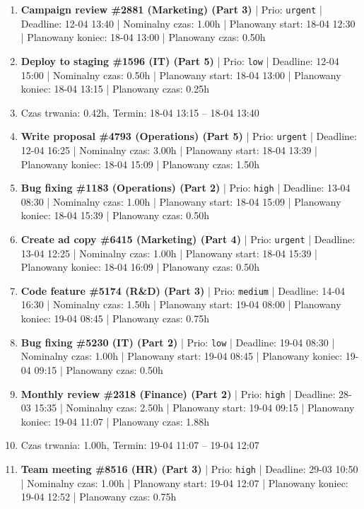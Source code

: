 {\begin{enumerate}
  \item [\textbf{14599}] \textbf{Campaign review \#2881 (Marketing) (Part 3)} | Prio: \texttt{urgent} | Deadline: 12-04 13:40 | Nominalny czas: 1.00h | Planowany start: 18-04 12:30 | Planowany koniec: 18-04 13:00 | Planowany czas: 0.50h
  \item [\textbf{14692}] \textbf{Deploy to staging \#1596 (IT) (Part 5)} | Prio: \texttt{low} | Deadline: 12-04 15:00 | Nominalny czas: 0.50h | Planowany start: 18-04 13:00 | Planowany koniec: 18-04 13:15 | Planowany czas: 0.25h
  \item [\textbf{PRZERWA}] Czas trwania: 0.42h, Termin: 18-04 13:15 -- 18-04 13:40
  \item [\textbf{14600}] \textbf{Write proposal \#4793 (Operations) (Part 5)} | Prio: \texttt{urgent} | Deadline: 12-04 16:25 | Nominalny czas: 3.00h | Planowany start: 18-04 13:39 | Planowany koniec: 18-04 15:09 | Planowany czas: 1.50h
  \item [\textbf{14613}] \textbf{Bug fixing \#1183 (Operations) (Part 2)} | Prio: \texttt{high} | Deadline: 13-04 08:30 | Nominalny czas: 1.00h | Planowany start: 18-04 15:09 | Planowany koniec: 18-04 15:39 | Planowany czas: 0.50h
  \item [\textbf{14602}] \textbf{Create ad copy \#6415 (Marketing) (Part 4)} | Prio: \texttt{urgent} | Deadline: 13-04 12:25 | Nominalny czas: 1.00h | Planowany start: 18-04 15:39 | Planowany koniec: 18-04 16:09 | Planowany czas: 0.50h
  \item [\textbf{14646}] \textbf{Code feature \#5174 (R\&D) (Part 3)} | Prio: \texttt{medium} | Deadline: 14-04 16:30 | Nominalny czas: 1.50h | Planowany start: 19-04 08:00 | Planowany koniec: 19-04 08:45 | Planowany czas: 0.75h
  \item [\textbf{14680}] \textbf{Bug fixing \#5230 (IT) (Part 2)} | Prio: \texttt{low} | Deadline: 19-04 08:30 | Nominalny czas: 1.00h | Planowany start: 19-04 08:45 | Planowany koniec: 19-04 09:15 | Planowany czas: 0.50h
  \item [\textbf{14618}] \textbf{Monthly review \#2318 (Finance) (Part 2)} | Prio: \texttt{high} | Deadline: 28-03 15:35 | Nominalny czas: 2.50h | Planowany start: 19-04 09:15 | Planowany koniec: 19-04 11:07 | Planowany czas: 1.88h
  \item [\textbf{PRZERWA}] Czas trwania: 1.00h, Termin: 19-04 11:07 -- 19-04 12:07
  \item [\textbf{14624}] \textbf{Team meeting \#8516 (HR) (Part 3)} | Prio: \texttt{high} | Deadline: 29-03 10:50 | Nominalny czas: 1.00h | Planowany start: 19-04 12:07 | Planowany koniec: 19-04 12:52 | Planowany czas: 0.75h

\end{enumerate}}
